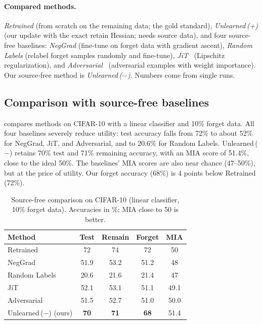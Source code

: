 \documentclass[10pt,twocolumn,letterpaper]{article}
\begin{document}
\paragraph{Compared methods.} \emph{Retrained} (from scratch on the remaining data; the gold standard), \emph{Unlearned\,(+)} (our update with the exact retain Hessian; needs source data), and four source-free baselines: \emph{NegGrad} (fine-tune on forget data with gradient ascent), \emph{Random Labels} (relabel forget samples randomly and fine-tune), \emph{JiT}~\cite{foster2024information} (Lipschitz regularization), and \emph{Adversarial}~\cite{cha2024learning} (adversarial examples with weight importance). Our source-free method is \emph{Unlearned\,($-$)}. Numbers come from single runs.

\subsection{Comparison with source-free baselines}
 compares methods on CIFAR-10 with a linear classifier and 10\% forget data. All four baselines severely reduce utility: test accuracy falls from 72\% to about 52\% for NegGrad, JiT, and Adversarial, and to 20.6\% for Random Labels. Unlearned\,($-$) retains 70\% test and 71\% remaining accuracy, with an MIA score of 51.4\%, close to the ideal 50\%. The baselines' MIA scores are also near chance (47--50\%), but at the price of utility. Our forget accuracy (68\%) is 4 points below Retrained (72\%).

\begin{table}[t]
  \centering
  \small
  \begin{tabular}{@{}lcccc@{}}
    \toprule
    Method & Test & Remain & Forget & MIA \\
    \midrule
    Retrained & 72 & 74 & 72 & 50 \\
    \midrule
    NegGrad & 51.9 & 53.2 & 51.2 & 48 \\
    Random Labels & 20.6 & 21.6 & 21.4 & 47 \\
    JiT & 52.1 & 53.1 & 51.1 & 49.1 \\
    Adversarial & 51.5 & 52.7 & 51.0 & 50.0 \\
    Unlearned\,($-$) (ours) & \textbf{70} & \textbf{71} & \textbf{68} & 51.4 \\
    \bottomrule
  \end{tabular}
  \caption{Source-free comparison on CIFAR-10 (linear classifier, 10\% forget data). Accuracies in \%; MIA close to 50 is better.}
  \label{tab:baselines}
\end{table}
\end{document}

